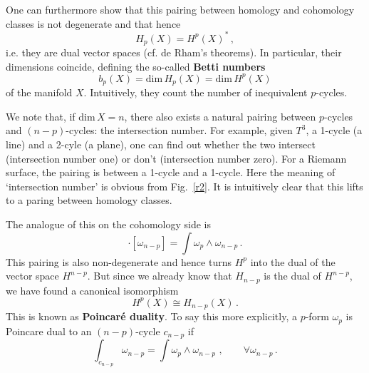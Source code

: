 \documentclass[12pt]{article}
\newcommand{\be}{\begin{equation}}
\newcommand{\ee}{\end{equation}}
\numberwithin{equation}{section}
\begin{document}
One can furthermore show that this pairing between homology and cohomology classes is not degenerate and that hence 
\be
H_p(X)=H^p(X)^*\,,
\ee
i.e. they are dual vector spaces (cf. de Rham's theorems). In particular, their dimensions coincide, defining the so-called {\bf Betti numbers} 
\be
b_p(X)=\mbox{dim}\,H_p(X)=\mbox{dim}\,H^p(X)
\ee
of the manifold $X$. Intuitively, they count the number of inequivalent $p$-cycles. 

We note that, if dim$\,X=n$, there also exists a natural pairing between $p$-cycles and $(n-p)$-cycles: the intersection number. For example, given $T^3$, a 1-cycle (a line) and a 2-cyle (a plane), one can find out whether the two intersect (intersection number one) or don't (intersection number zero). For a Riemann surface, the pairing is between a 1-cycle and a 1-cycle. Here the meaning of `intersection number' is obvious from Fig.~\ref{r2}. It is intuitively clear that this lifts to a paring between homology classes.

The analogue of this on the cohomology side is
\be
[\omega_p]\cdot[\omega_{n-p}]=\int\omega_p\wedge\omega_{n-p}\,.
\ee
This pairing is also non-degenerate and hence turns $H^p$ into the dual of the vector space $H^{n-p}$. But since we already know that $H_{n-p}$ is the dual of $H^{n-p}$, we have found a canonical isomorphism
\be
H^p(X)\cong H_{n-p}(X)\,.
\ee
This is known as {\bf Poincar\'{e} duality}. To say this more explicitly, a $p$-form $\omega_p$ is Poincare dual to an $(n-p)$-cycle $c_{n-p}$ if
\be
\int_{c_{n-p}}\omega_{n-p}=\int \omega_p\wedge \omega_{n-p}\,\,,\qquad \forall 
\omega_{n-p}\,.
\ee
\end{document}
